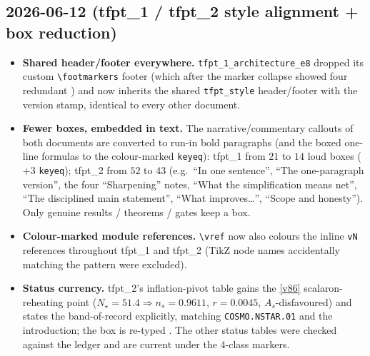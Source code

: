 \subsection*{2026-06-12 (tfpt\_1 / tfpt\_2 style alignment + box reduction)}
\begin{itemize}
\item \textbf{Shared header/footer everywhere.} \texttt{tfpt\_1\_architecture\_e8} dropped its custom
  \texttt{\textbackslash footmarkers} footer (which after the marker collapse showed four redundant
  \mE) and now inherits the shared \texttt{tfpt\_style} header/footer with the version stamp, identical
  to every other document.
\item \textbf{Fewer boxes, embedded in text.} The narrative/commentary callouts of both documents are
  converted to run-in bold paragraphs (and the boxed one-line formulas to the colour-marked
  \texttt{keyeq}): tfpt\_1 from $21$ to $14$ loud boxes ($+3$ \texttt{keyeq}); tfpt\_2 from $52$ to $43$
  (e.g.\ ``In one sentence'', ``The one-paragraph version'', the four ``Sharpening'' notes, ``What the
  simplification means net'', ``The disciplined main statement'', ``What improves\ldots'', ``Scope and
  honesty''). Only genuine results / theorems / gates keep a box.
\item \textbf{Colour-marked module references.} \texttt{\textbackslash vref} now also colours the inline
  \texttt{vN} references throughout tfpt\_1 and tfpt\_2 (TikZ node names accidentally matching the
  pattern were excluded).
\item \textbf{Status currency.} tfpt\_2's inflation-pivot table gains the \vref{v86} scalaron-reheating
  point ($N_\star{=}51.4\Rightarrow n_s{=}0.9611$, $r{=}0.0045$, $A_s$-disfavoured) and states the
  band-of-record explicitly, matching \texttt{COSMO.NSTAR.01} and the introduction; the box is re-typed
  \mC. The other status tables were checked against the ledger and are current under the 4-class markers.
\end{itemize}

